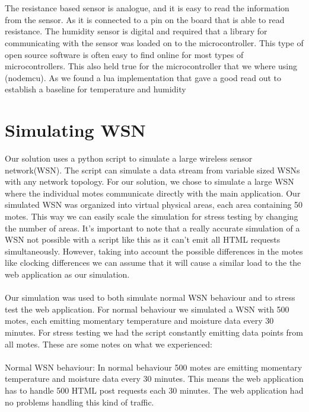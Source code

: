 \documentclass[]{uiophd}
\begin{document}
\\\\
The resistance based sensor is analogue, and it is easy to read the information from the sensor. As it is connected to a pin on the board that is able to read resistance. The humidity sensor is digital and required that a library for communicating with the sensor was loaded on to the microcontroller. This type of open source software is often easy to find online for most types of microcontrollers. This also held true for the microcontroller that we where using (nodemcu). As we found a lua implementation that gave a good read out to establish a baseline for temperature and humidity

\section{Simulating WSN}
Our solution uses a python script to simulate a large wireless sensor network(WSN). The script can simulate a data stream from variable sized WSNs with any network topology. For our solution, we chose to simulate a large WSN where the individual motes communicate directly with the main application. Our simulated WSN was organized into virtual physical areas, each area containing 50 motes. This way we can easily scale the simulation for stress testing by changing the number of areas. It’s important to note that a really accurate simulation of a WSN not possible with a script like this as it can’t emit all HTML requests simultaneously. However, taking into account the possible differences in the motes like clocking differences we can assume that it will cause a similar load to the the web application as our simulation.
\\\\
Our simulation was used to both simulate normal WSN behaviour and to stress test the web application. For normal behaviour we simulated a WSN with 500 motes, each emitting momentary temperature and moisture data every 30 minutes. For stress testing we had the script constantly emitting data points from all motes. These are some notes on what we experienced:
\\\\
Normal WSN behaviour: In normal behaviour 500 motes are emitting momentary temperature and moisture data every 30 minutes. This means the web application has to handle 500 HTML post requests each 30 minutes. The web application had no problems handling this kind of traffic.
\\\\
\end{document}
